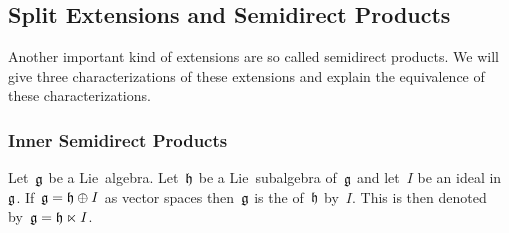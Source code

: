 %  



\subsection{Split Extensions and Semidirect Products}

\begin{fluff}
  Another important kind of extensions are so called semidirect products.
  We will give three characterizations of these extensions and explain the equivalence of these characterizations.
\end{fluff}

\subsubsection{Inner Semidirect Products}


\begin{definition}
  Let~$\mathfrak{g}$ be a Lie~algebra.
  Let~$\mathfrak{h}$ be a Lie~subalgebra of~$\mathfrak{g}$ and let~$I$ be an ideal in~$\mathfrak{g}$.
  If~$\mathfrak{g} = \mathfrak{h} \oplus I$ as vector spaces then~$\mathfrak{g}$ is the  of~$\mathfrak{h}$ by~$I$.
  This is then denoted by~$\mathfrak{g} = \mathfrak{h} \ltimes I$.
\end{definition}



